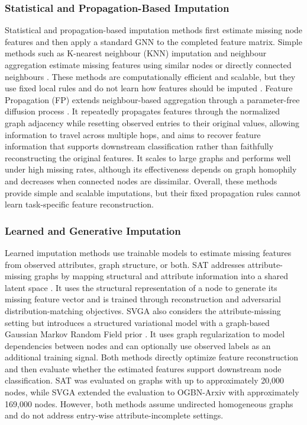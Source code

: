\subsubsection{Statistical and Propagation-Based Imputation}
Statistical and propagation-based imputation methods first estimate missing node features and then apply a standard GNN to the completed feature matrix. Simple methods such as K-nearest neighbour (KNN) imputation and neighbour aggregation estimate missing features using similar nodes or directly connected neighbours \cite{you2020handling}. These methods are computationally efficient and scalable, but they use fixed local rules and do not learn how features should be imputed \cite{yoo2022accurate}. Feature Propagation (FP) extends neighbour-based aggregation through a parameter-free diffusion process \cite{rossi2022unreasonable}. It repeatedly propagates features through the normalized graph adjacency while resetting observed entries to their original values, allowing information to travel across multiple hops, and aims to recover feature information that supports downstream classification rather than faithfully reconstructing the original features. It scales to large graphs and performs well under high missing rates, although its effectiveness depends on graph homophily and decreases when connected nodes are dissimilar. Overall, these methods provide simple and scalable imputations, but their fixed propagation rules cannot learn task-specific feature reconstruction.

\subsubsection{Learned and Generative Imputation}
Learned imputation methods use trainable models to estimate missing features from observed attributes, graph structure, or both. SAT addresses attribute-missing graphs by mapping structural and attribute information into a shared latent space \cite{chen2020learning}. It uses the structural representation of a node to generate its missing feature vector and is trained through reconstruction and adversarial distribution-matching objectives. SVGA also considers the attribute-missing setting but introduces a structured variational model with a graph-based Gaussian Markov Random Field prior \cite{yoo2022accurate}. It uses graph regularization to model dependencies between nodes and can optionally use observed labels as an additional training signal. Both methods directly optimize feature reconstruction and then evaluate whether the estimated features support downstream node classification. SAT was evaluated on graphs with up to approximately 20,000 nodes, while SVGA extended the evaluation to OGBN-Arxiv with approximately 169,000 nodes. However, both methods assume undirected homogeneous graphs and do not address entry-wise attribute-incomplete settings.

